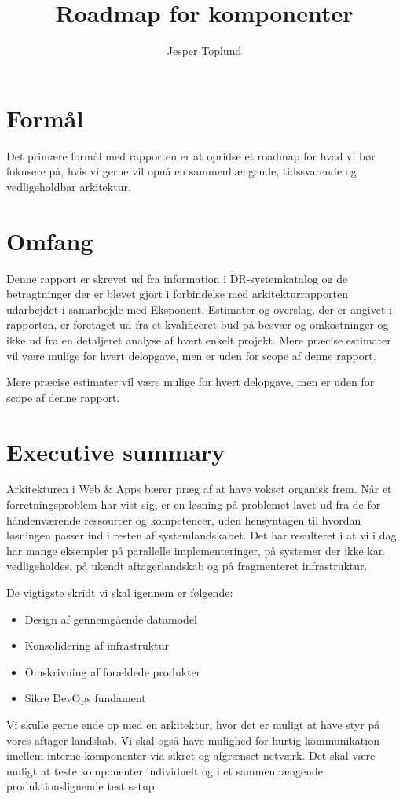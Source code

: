 \documentclass{article}
\author {Jesper Toplund}
\title{Roadmap for komponenter}
\date{}
\begin{document}
\maketitle

\vspace{20 mm}
\begin{quote}
    \textit{}
\end{quote}

\section{Formål}
Det primære formål med rapporten er at opridse et roadmap for hvad vi bør fokusere på, hvis vi gerne vil opnå en sammenhængende, tidssvarende og vedligeholdbar arkitektur.

\section{Omfang}
Denne rapport er skrevet ud fra information i DR-systemkatalog og de betragtninger der er blevet gjort i forbindelse med arkitekturrapporten udarbejdet i samarbejde med Eksponent. Estimater og overslag, der er angivet i rapporten, er foretaget ud fra et kvalificeret bud på besvær og omkostninger og ikke ud fra en detaljeret analyse af hvert enkelt projekt. Mere præcise estimater vil være mulige for hvert delopgave, men er uden for scope af denne rapport.
 
Mere præcise estimater vil være mulige for hvert delopgave, men er uden for scope af denne rapport.

\section{Executive summary}
Arkitekturen i Web \& Apps bærer præg af at have vokset organisk frem. Når et forretningsproblem har vist sig, er en løsning på problemet lavet ud fra de for håndenværende ressourcer og kompetencer, uden hensyntagen til hvordan løsningen passer ind i resten af systemlandskabet. Det har resulteret i at vi i dag har mange eksempler på parallelle implementeringer, på systemer der ikke kan vedligeholdes, på ukendt aftagerlandskab og på fragmenteret infrastruktur.

De vigtigste skridt vi skal igennem er følgende:
\begin{itemize}
\item Design af gennemgående datamodel
\item Konsolidering af infrastruktur
\item Omskrivning af forældede produkter
\item Sikre DevOps fundament
\end{itemize}
Vi skulle gerne ende op med en arkitektur, hvor det er muligt at have styr på vores aftager-landskab. Vi skal også have mulighed for hurtig kommunikation imellem interne komponenter via sikret og afgrænset netværk. Det skal være muligt at teste komponenter individuelt og i et sammenhængende produktionslignende test setup.
\end{document}
